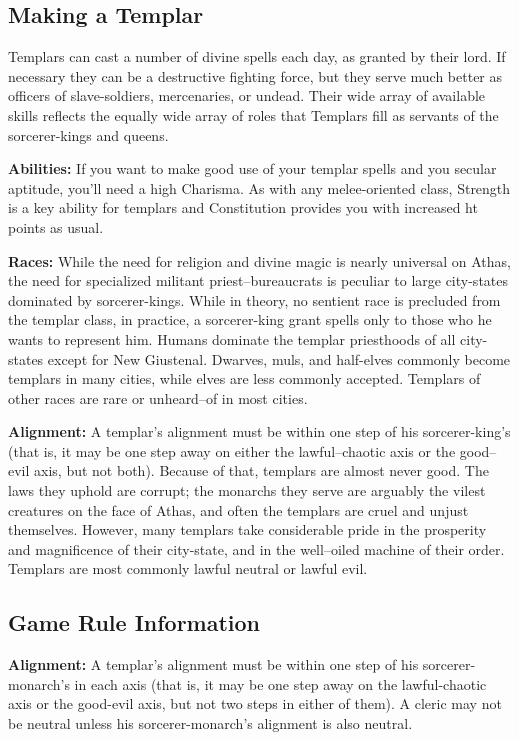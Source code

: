 \subsection{Making a Templar}
Templars can cast a number of divine spells each day, as granted by their lord. If necessary they can be a destructive fighting force, but they serve much better as officers of slave-soldiers, mercenaries, or undead. Their wide array of available skills reflects the equally wide array of roles that Templars fill as servants of the sorcerer-kings and queens.

\textbf{Abilities:} If you want to make good use of your templar spells and you secular aptitude, you'll need a high Charisma. As with any melee-oriented class, Strength is a key ability for templars and Constitution provides you with increased ht points as usual.

\textbf{Races:} While the need for religion and divine magic is nearly universal on Athas, the need for specialized militant priest--bureaucrats is peculiar to large city-states dominated by sorcerer-kings. While in theory, no sentient race is precluded from the templar class, in practice, a sorcerer-king grant spells only to those who he wants to represent him. Humans dominate the templar priesthoods of all city-states except for New Giustenal. Dwarves, muls, and half-elves commonly become templars in many cities, while elves are less commonly accepted. Templars of other races are rare or unheard--of in most cities.

\textbf{Alignment:} A templar's alignment must be within one step of his sorcerer-king's (that is, it may be one step away on either the lawful--chaotic axis or the good--evil axis, but not both). Because of that, templars are almost never good. The laws they uphold are corrupt; the monarchs they serve are arguably the vilest creatures on the face of Athas, and often the templars are cruel and unjust themselves. However, many templars take considerable pride in the prosperity and magnificence of their city-state, and in the well--oiled machine of their order. Templars are most commonly lawful neutral or lawful evil.

\subsection{Game Rule Information}

\textbf{Alignment:} A templar's alignment must be within one step of his sorcerer-monarch's in each axis (that is, it may be one step away on the lawful-chaotic axis or the good-evil axis, but not two steps in either of them). A cleric may not be neutral unless his sorcerer-monarch's alignment is also neutral.

